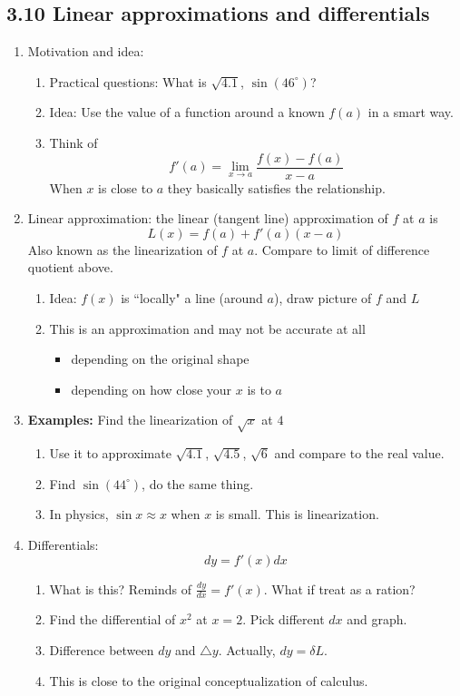\documentclass{article}
\begin{document}
\subsection{3.10 Linear approximations and differentials }
\begin{enumerate}

\item Motivation and idea:
\begin{enumerate}
\item Practical questions: What is $\sqrt{4.1}$, $\sin(46^\circ)$?
\item Idea: Use the value of a function around a known $f(a)$ in a smart way.
\item Think of
$$
f'(a)=\lim_{x\rightarrow a}\frac{f(x)-f(a)}{x-a}
$$
When $x$ is close to $a$ they basically satisfies the relationship.
\end{enumerate}

\item Linear approximation: the linear (tangent line) approximation of $f$ at $a$ is 
$$
L(x) = f(a)+f'(a)(x-a)
$$
Also known as the linearization of $f$ at $a$. Compare to limit of difference quotient above.
\begin{enumerate}
\item Idea: $f(x)$ is ``locally" a line (around $a$), draw picture of $f$ and $L$
\item This is an approximation and may not be accurate at all
\begin{itemize}
\item depending on the original shape
\item depending on how close your $x$ is to $a$
\end{itemize}
\end{enumerate}

\item {\bf Examples:} Find the linearization of $\sqrt{x}$ at $4$
\begin{enumerate}
\item Use it to approximate $\sqrt{4.1}$, $\sqrt{4.5}$, $\sqrt{6}$ and compare to the real value.
\item Find $\sin(44^\circ)$, do the same thing.
\item In physics, $\sin x\approx x$ when $x$ is small. This is linearization.
\end{enumerate}

\item Differentials: 
$$
dy = f'(x) dx
$$
\begin{enumerate}
\item What is this? Reminds of $\frac{dy}{dx}=f'(x)$. What if treat as a ration?
\item Find the differential of $x^2$ at $x =2$. Pick different $dx$ and graph.
\item Difference between $dy$ and $\triangle y$. Actually, $dy=\delta L$.
\item This is close to the original conceptualization of calculus.
\end{enumerate}


\end{enumerate}
\end{document}
